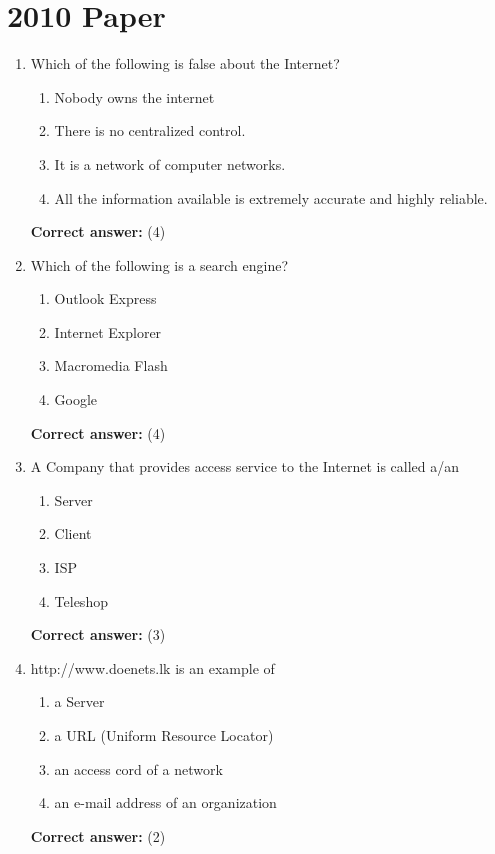 \documentclass[12pt]{article}
\begin{document}
\section*{2010 Paper}
\begin{enumerate}[label=Q\arabic*:,leftmargin=*,resume]
\item Which of the following is false about the Internet?\\
\begin{enumerate}[label=(\arabic*)]
\item Nobody owns the internet
\item There is no centralized control.
\item It is a network of computer networks.
\item All the information available is extremely accurate and highly reliable.
\end{enumerate}
\textbf{Correct answer:} (4)

\item Which of the following is a search engine?\\
\begin{enumerate}[label=(\arabic*)]
\item Outlook Express
\item Internet Explorer
\item Macromedia Flash
\item Google
\end{enumerate}
\textbf{Correct answer:} (4)

\item A Company that provides access service to the Internet is called a/an\\
\begin{enumerate}[label=(\arabic*)]
\item Server
\item Client
\item ISP
\item Teleshop
\end{enumerate}
\textbf{Correct answer:} (3)

\item http://www.doenets.lk is an example of\\
\begin{enumerate}[label=(\arabic*)]
\item a Server
\item a URL (Uniform Resource Locator)
\item an access cord of a network
\item an e-mail address of an organization
\end{enumerate}
\textbf{Correct answer:} (2)
\end{enumerate}
\end{document}
